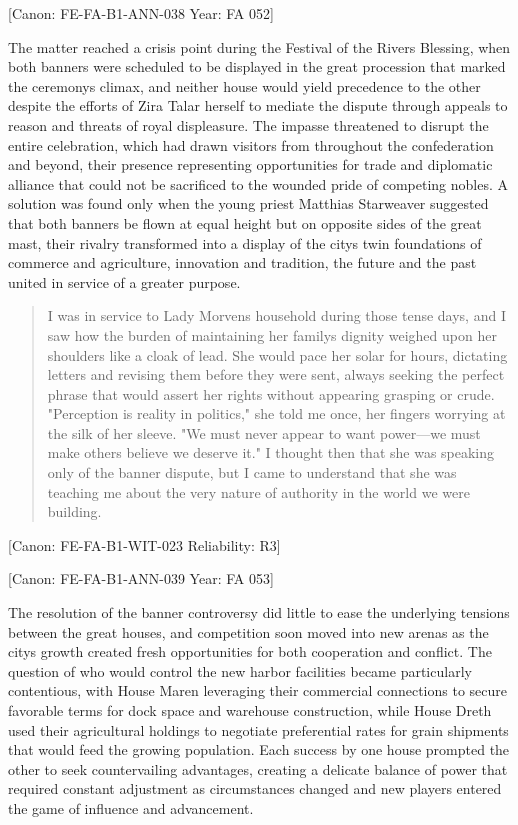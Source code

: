 {[}Canon: FE-FA-B1-ANN-038 \textbar{} Year: FA 052{]}

The matter reached a crisis point during the Festival of the
River\textquotesingle s Blessing, when both banners were scheduled to be
displayed in the great procession that marked the
ceremony\textquotesingle s climax, and neither house would yield
precedence to the other despite the efforts of Zira Talar herself to
mediate the dispute through appeals to reason and threats of royal
displeasure. The impasse threatened to disrupt the entire celebration,
which had drawn visitors from throughout the confederation and beyond,
their presence representing opportunities for trade and diplomatic
alliance that could not be sacrificed to the wounded pride of competing
nobles. A solution was found only when the young priest Matthias
Starweaver suggested that both banners be flown at equal height but on
opposite sides of the great mast, their rivalry transformed into a
display of the city\textquotesingle s twin foundations of commerce and
agriculture, innovation and tradition, the future and the past united in
service of a greater purpose.

\begin{quote}
I was in service to Lady Morven\textquotesingle s household during those
tense days, and I saw how the burden of maintaining her
family\textquotesingle s dignity weighed upon her shoulders like a cloak
of lead. She would pace her solar for hours, dictating letters and
revising them before they were sent, always seeking the perfect phrase
that would assert her rights without appearing grasping or crude.
"Perception is reality in politics," she told me once, her fingers
worrying at the silk of her sleeve. "We must never appear to want
power---we must make others believe we deserve it." I thought then that
she was speaking only of the banner dispute, but I came to understand
that she was teaching me about the very nature of authority in the world
we were building.
\end{quote}

{[}Canon: FE-FA-B1-WIT-023 \textbar{} Reliability: R3{]}

{[}Canon: FE-FA-B1-ANN-039 \textbar{} Year: FA 053{]}

The resolution of the banner controversy did little to ease the
underlying tensions between the great houses, and competition soon moved
into new arenas as the city\textquotesingle s growth created fresh
opportunities for both cooperation and conflict. The question of who
would control the new harbor facilities became particularly contentious,
with House Maren leveraging their commercial connections to secure
favorable terms for dock space and warehouse construction, while House
Dreth used their agricultural holdings to negotiate preferential rates
for grain shipments that would feed the growing population. Each success
by one house prompted the other to seek countervailing advantages,
creating a delicate balance of power that required constant adjustment
as circumstances changed and new players entered the game of influence
and advancement.

